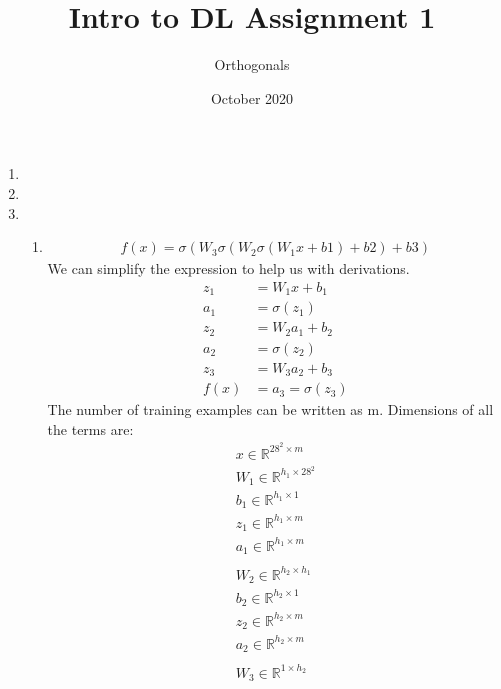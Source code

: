 \documentclass{article}
\title{Intro to DL Assignment 1}
\author{Orthogonals}
\date{October 2020}
\begin{document}
\maketitle
\newpage
\begin{enumerate}
    \item
    \newpage

    \item
    \newpage

    \item

    \begin{enumerate}
        \item

        \begin{align*}
            f(x) = \sigma(W_3\sigma(W_2\sigma(W_1 x + b1) + b2) + b3)
        \end{align*}
        We can simplify the expression to help us with derivations.
        \begin{align*}
            z_1 &= W_1 x + b_1\\
            a_1 &= \sigma(z_1)\\
            z_2 &= W_2 a_1 + b_2\\
            a_2 &= \sigma(z_2)\\
            z_3 &= W_3 a_2 + b_3\\
            f(x) &= a_3 = \sigma(z_3)
        \end{align*}
        The number of training examples can be written as m. Dimensions of all the terms are:
        \begin{align*}
            x \in\mathbb{R}^{28^2 \times m}\\
            W_1 \in\mathbb{R}^{h_1 \times 28^2}\\
            b_1 \in\mathbb{R}^{h_1 \times 1}\\
            z_1 \in\mathbb{R}^{h_1 \times m}\\
            a_1 \in\mathbb{R}^{h_1 \times m}\\
            \\
            W_2 \in\mathbb{R}^{h_2 \times h_1}\\
            b_2 \in\mathbb{R}^{h_2 \times 1}\\
            z_2 \in\mathbb{R}^{h_2 \times m}\\
            a_2 \in\mathbb{R}^{h_2 \times m}\\
            \\
            W_3 \in\mathbb{R}^{1 \times h_2}\\

\end{align*}
\end{enumerate}
\end{enumerate}
\end{document}
